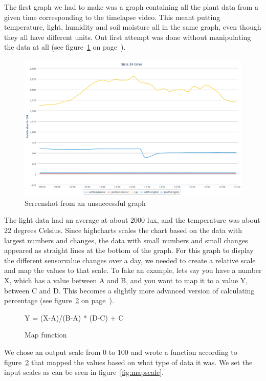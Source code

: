 The first graph we had to make was a graph containing all the plant data from a given time corresponding to the timelapse video. This meant putting temperature, light, humidity and soil moisture all in the same graph, even though they all have different units. Out first attempt was done without manipulating the data at all (see figure~\ref{fig:badgraph} on page~\pageref{fig:badgraph}). 

\begin{figure}
\centering
\includegraphics[width=1\textwidth]{img/interface/badgraph.png}
\caption{Screenshot from an unsuccessful graph}
\label{fig:badgraph}
\end{figure}

The light data had an average at about 2000 lux, and the temperature was about 22 degrees Celsius. Since highcharts scales the chart based on the data with largest numbers and changes, the data with small numbers and small changes appeared as straight lines at the bottom of the graph. 
For this graph to display the different sensorvalue changes over a day, we needed to create a relative scale and map the values to that scale. To fake an example, lets say you have a number X, which has a value between A and B, and you want to map it to a value Y, between C and D. This becomes a slightly more advanced version of calculating percentage (see figure~\ref{fig:mapfunc} on page~\pageref{fig:mapfunc}).

\begin{figure}
\centering
Y = (X-A)/(B-A) * (D-C) + C
\caption{Map function}
\label{fig:mapfunc}
\end{figure}

We chose an output scale from 0 to 100 and wrote a function according to figure~\ref{fig:mapfunc} that mapped the values based on what type of data it was. We set the input scales as can be seen in figure~\ref{fig:mapscale}.

